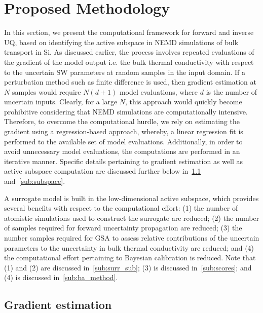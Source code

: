 \section{Proposed Methodology}
\label{sec:method}

In this section, we present the computational framework for forward and inverse UQ, based on identifying
the active subspace in NEMD simulations of bulk transport
in Si. As discussed earlier, the process involves repeated evaluations of the gradient of the model output
i.e. the bulk thermal conductivity with respect to the uncertain SW parameters at random samples
in the input domain. If a perturbation method such as finite difference is used, then gradient
estimation at $N$ samples would require $N(d+1)$ model evaluations, where $d$ is the number
of uncertain inputs. Clearly, for a large $N$, this approach would quickly become prohibitive
considering that NEMD simulations are computationally intensive. Therefore, to overcome the
computational hurdle, we rely on estimating the gradient using a regression-based approach,
whereby, a linear regression fit is performed to the available set of model evaluations. Additionally, in order
to avoid unnecessary model evaluations, the computations are performed
in an iterative manner. Specific details pertaining to gradient estimation as well as active
subspace computation are discussed further below in~\ref{sub:gradient} and~\ref{sub:subspace}. 

A surrogate model is built in the low-dimensional active subspace, which provides several benefits with respect
to the computational effort: (1) the number of atomistic simulations used to construct the surrogate are
reduced; (2) the number of samples required for forward uncertainty propagation are reduced; (3) the number samples required for GSA to assess relative contributions of the uncertain parameters to the uncertainty in
bulk thermal conductivity are reduced; and (4) the computational effort pertaining to
Bayesian calibration is reduced.
Note that (1) and (2) are discussed in~\ref{sub:surr_sub}; (3) is discussed
in~\ref{sub:scores}; and (4) is discussed in~\ref{sub:ba_method}.

\subsection{Gradient estimation}
\label{sub:gradient} 

